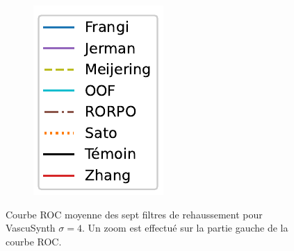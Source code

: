 \begin{figure}[!ht]
\begin{subfigure}[t]{0.2\textwidth}
  \includegraphics[width=\textwidth,clip = true]{Images/standAloneLegend.pdf}
\end{subfigure}
\caption{Courbe ROC moyenne des sept filtres de rehaussement pour VascuSynth $\sigma=4$. Un zoom est effectué sur la partie gauche de la courbe ROC.}
\end{figure}
